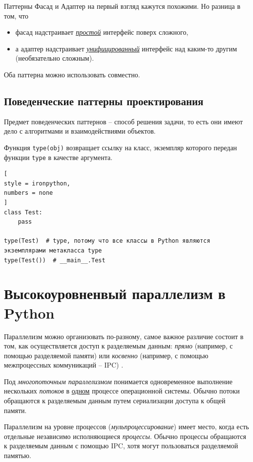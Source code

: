 \documentclass[%
	11pt,
	a4paper,
	utf8,
		]{article}
\begin{document}
Паттерны Фасад и Адаптер на первый взгляд кажутся похожими. Но разница в том, что
\begin{itemize}
	\item фасад надстраивает \underline{\itshape простой} интерфейс поверх сложного,
	
	\item а адаптер надстраивает \underline{\itshape унифицированный} интерфейс над каким-то другим (необязательно сложным).
\end{itemize}

Оба паттерна можно использовать совместно.

\subsection{Поведенческие паттерны проектирования}

Предмет поведенческих паттернов -- способ решения задачи, то есть они имеют дело с алгоритмами и взаимодействиями объектов.

Функция \texttt{type(obj)} возвращает ссылку на класс, экземпляр которого передан функции \texttt{type} в качестве аргумента.

\begin{lstlisting}[
style = ironpython,
numbers = none
]
class Test:
    pass
    
type(Test)  # type, потому что все классы в Python являются экземплярами метакласса type
type(Test())  # __main__.Test
\end{lstlisting}

\section{Высокоуровненвый параллелизм в Python}

Параллелизм можно организовать по-разному, самое важное различие состоит в том, как осуществляется доступ к разделяемым данным: \emph{прямо} (например, с помощью разделяемой памяти) или \emph{косвенно} (например, с помощью межпроцессных коммуникаций -- IPC) \cite[]{summerfield:python_practice}. 

Под \emph{многопоточным параллелизмом} понимается одновременное выполнение нескольких \emph{потоков} в \underline{одном} процессе операционной системы. Обычно потоки обращаются к разделяемым данным путем сериализации доступа к общей памяти.

Параллелизм на уровне процессов (\emph{мульпроцессирование}) имеет место, когда есть отдельные независимо исполняющиеся \emph{процессы}. Обычно процессы обращаются к разделяемым данным с помощью IPC, хотя могут пользоваться разделяемой памятью.
\end{document}
